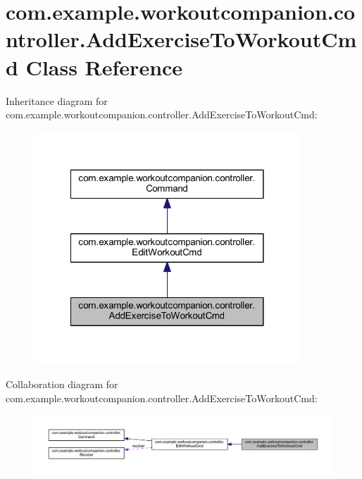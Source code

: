 \hypertarget{classcom_1_1example_1_1workoutcompanion_1_1controller_1_1_add_exercise_to_workout_cmd}{\section{com.\-example.\-workoutcompanion.\-controller.\-Add\-Exercise\-To\-Workout\-Cmd Class Reference}
\label{classcom_1_1example_1_1workoutcompanion_1_1controller_1_1_add_exercise_to_workout_cmd}
}


Inheritance diagram for com.\-example.\-workoutcompanion.\-controller.\-Add\-Exercise\-To\-Workout\-Cmd\-:
\nopagebreak
\begin{figure}[H]
\begin{center}
\leavevmode
\includegraphics[width=284pt]{classcom_1_1example_1_1workoutcompanion_1_1controller_1_1_add_exercise_to_workout_cmd__inherit__graph}
\end{center}
\end{figure}


Collaboration diagram for com.\-example.\-workoutcompanion.\-controller.\-Add\-Exercise\-To\-Workout\-Cmd\-:
\nopagebreak
\begin{figure}[H]
\begin{center}
\leavevmode
\includegraphics[width=350pt]{classcom_1_1example_1_1workoutcompanion_1_1controller_1_1_add_exercise_to_workout_cmd__coll__graph}
\end{center}
\end{figure}

